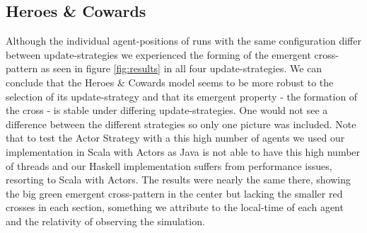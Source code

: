 \subsection{Heroes \& Cowards}
Although the individual agent-positions of runs with the same configuration differ between update-strategies we experienced the forming of the emergent cross-pattern as seen in figure \ref{fig:results} in all four update-strategies. We can conclude that the Heroes \& Cowards model seems to be more robust to the selection of its update-strategy and that its emergent property - the formation of the cross - is stable under differing update-strategies. One would not see a difference between the different strategies so only one picture was included. Note that to test the Actor Strategy with a this high number of agents we used our implementation in Scala with Actors as Java is not able to have this high number of threads and our Haskell implementation suffers from performance issues, resorting to Scala with Actors. The results were nearly the same there, showing the big green emergent cross-pattern in the center but lacking the smaller red crosses in each section, something we attribute to the local-time of each agent and the relativity of observing the simulation.
